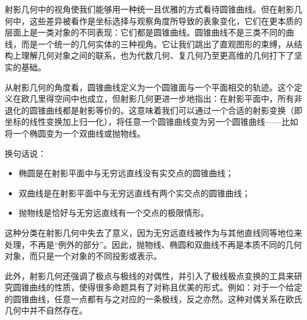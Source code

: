 射影几何中的视角使我们能够用一种统一且优雅的方式看待圆锥曲线。但在射影几何中，这些差异被看作是坐标选择与观察角度所导致的表象变化，它们在更本质的层面上是一类对象的不同表现：它们都是圆锥曲线。圆锥曲线不是三类不同的曲线，而是一个统一的几何实体的三种视角。它让我们跳出了直观图形的束缚，从结构上理解几何对象之间的联系，也为代数几何、复几何乃至更高维的几何打下了坚实的基础。

从射影几何的角度看，圆锥曲线定义为一个圆锥面与一个平面相交的轨迹。这个定义在欧几里得空间中也成立，但射影几何更进一步地指出：在射影平面中，所有非退化的圆锥曲线都是射影等价的。这意味着我们可以通过一个合适的射影变换（即坐标的线性变换加上归一化），将任意一个圆锥曲线变为另一个圆锥曲线——比如将一个椭圆变为一个双曲线或抛物线。

换句话说：
\begin{itemize}
\item 椭圆是在射影平面中与无穷远直线没有实交点的圆锥曲线；
\item 双曲线是在射影平面中与无穷远直线有两个实交点的圆锥曲线；
\item 抛物线是恰好与无穷远直线有一个交点的极限情形。
\end{itemize}

这种分类在射影几何中失去了意义，因为无穷远直线被作为与其他直线同等地位来处理，不再是“例外的部分”。因此，抛物线、椭圆和双曲线不再是本质不同的几何对象，而只是一个对象的不同投影或表示。

此外，射影几何还强调了极点与极线的对偶性，并引入了极线极点变换的工具来研究圆锥曲线的性质，使得很多命题具有了对称且优美的形式。例如：对于一个给定的圆锥曲线，任意一点都有与之对应的一条极线，反之亦然。这种对偶关系在欧氏几何中并不自然存在。